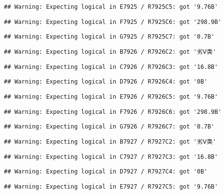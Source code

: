 \documentclass[
]{article}
\begin{document}
\begin{verbatim}
## Warning: Expecting logical in E7925 / R7925C5: got '9.76B'
\end{verbatim}

\begin{verbatim}
## Warning: Expecting logical in F7925 / R7925C6: got '298.9B'
\end{verbatim}

\begin{verbatim}
## Warning: Expecting logical in G7925 / R7925C7: got '0.7B'
\end{verbatim}

\begin{verbatim}
## Warning: Expecting logical in B7926 / R7926C2: got '劣Ⅴ类'
\end{verbatim}

\begin{verbatim}
## Warning: Expecting logical in C7926 / R7926C3: got '16.8B'
\end{verbatim}

\begin{verbatim}
## Warning: Expecting logical in D7926 / R7926C4: got '0B'
\end{verbatim}

\begin{verbatim}
## Warning: Expecting logical in E7926 / R7926C5: got '9.76B'
\end{verbatim}

\begin{verbatim}
## Warning: Expecting logical in F7926 / R7926C6: got '298.9B'
\end{verbatim}

\begin{verbatim}
## Warning: Expecting logical in G7926 / R7926C7: got '0.7B'
\end{verbatim}

\begin{verbatim}
## Warning: Expecting logical in B7927 / R7927C2: got '劣Ⅴ类'
\end{verbatim}

\begin{verbatim}
## Warning: Expecting logical in C7927 / R7927C3: got '16.8B'
\end{verbatim}

\begin{verbatim}
## Warning: Expecting logical in D7927 / R7927C4: got '0B'
\end{verbatim}

\begin{verbatim}
## Warning: Expecting logical in E7927 / R7927C5: got '9.76B'
\end{verbatim}
\end{document}
